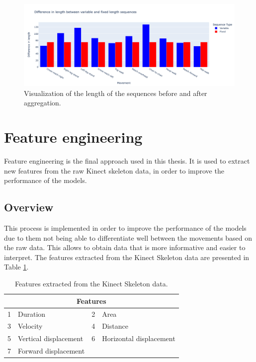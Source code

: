 \begin{figure}[H]
    \centering
    \includegraphics[width=1.0\textwidth]{../src/resources/plots/splits/seq_len.png}
    \caption{
        Visualization of the length of the sequences before and after aggregation.
    }
    \label{fig:seqlength}
\end{figure}

    \newpage
    
    \section{Feature engineering} \label{sec:feature_engineering}
        
        Feature engineering is the final approach used in this thesis. It is used to extract new features from the raw Kinect skeleton data, in order to improve the performance of the models.

        \subsection{Overview}

            This process is implemented  in order to improve the performance of the models due to them not being able to differentiate well between the movements based on the raw data. This allows to obtain data that is more informative and easier to interpret. The features extracted from the Kinect Skeleton data are presented in Table \ref{tab:features_table}.

        \begin{table}[htbp]
            \centering
            \begin{tabular}{@{}clcl@{}}
                \toprule
                \multicolumn{4}{c}{\textbf{Features}} \\
                \midrule
                1 & Duration & 2 & Area \\
                3 & Velocity & 4 & Distance \\
                5 & Vertical displacement & 6 & Horizontal displacement \\
                7 & Forward displacement &  & \\
                \bottomrule
            \end{tabular}
            \caption{Features extracted from the Kinect Skeleton data.}
            \label{tab:features_table}
        \end{table}


